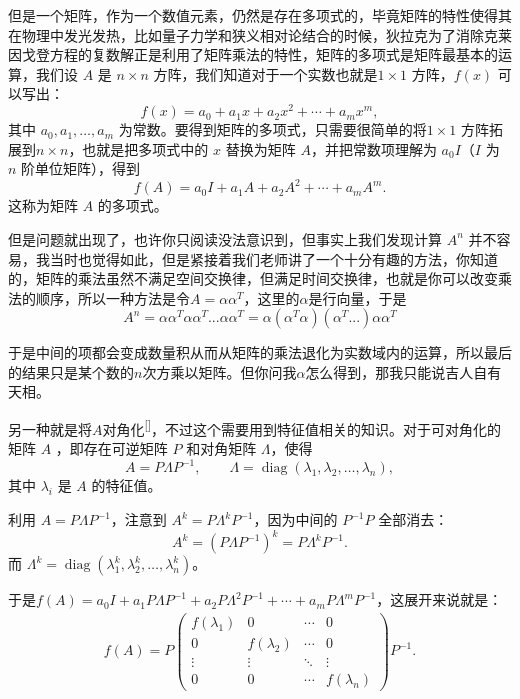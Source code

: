 \documentclass[UTF8]{ctexbook}
\begin{document}
但是一个矩阵，作为一个数值元素，仍然是存在多项式的，毕竟矩阵的特性使得其在物理中发光发热，比如量子力学和狭义相对论结合的时候，狄拉克为了消除克莱因戈登方程的复数解正是利用了矩阵乘法的特性，矩阵的多项式是矩阵最基本的运算，我们设 $A$ 是 $n	\times n$ 方阵，我们知道对于一个实数也就是$1	\times 1$ 方阵，$f(x)$ 可以写出：
\[
f(x)=a_0+a_1x+a_2x^2+\cdots+a_mx^m,
\]
其中 $a_0,a_1,\dots,a_m$ 为常数。要得到矩阵的多项式，只需要很简单的将$1	\times 1$ 方阵拓展到$n	\times n$，也就是把多项式中的 $x$ 替换为矩阵 $A$，并把常数项理解为 $a_0I$（$I$ 为 $n$ 阶单位矩阵），得到
\[
f(A)=a_0I+a_1A+a_2A^2+\cdots+a_mA^m.
\]
这称为矩阵 $A$ 的多项式。

但是问题就出现了，也许你只阅读没法意识到，但事实上我们发现计算 $A^n$ 并不容易，我当时也觉得如此，但是紧接着我们老师讲了一个十分有趣的方法，你知道的，矩阵的乘法虽然不满足空间交换律，但满足时间交换律，也就是你可以改变乘法的顺序，所以一种方法是令$A=\alpha \alpha^T$，这里的$\alpha$是行向量，于是
\[A^n=\alpha \alpha^T \alpha \alpha^T...\alpha \alpha^T=\alpha (\alpha^T \alpha) (\alpha^T...)\alpha \alpha^T\]

于是中间的项都会变成数量积从而从矩阵的乘法退化为实数域内的运算，所以最后的结果只是某个数的$n$次方乘以矩阵。但你问我$\alpha$怎么得到，那我只能说吉人自有天相。

另一种就是将$A$对角化\label{matrix_polynomial}\textsuperscript{[\pageref{diag}]}，不过这个需要用到特征值相关的知识。对于可对角化的矩阵 $A$ ，即存在可逆矩阵 $P$ 和对角矩阵 $\Lambda$，使得
\[
A = P \Lambda P^{-1}, \qquad
\Lambda = \operatorname{diag}(\lambda_1, \lambda_2, \dots, \lambda_n),
\]
其中 $\lambda_i$ 是 $A$ 的特征值。

利用 $A = P\Lambda P^{-1}$，注意到 $A^k = P\Lambda^k P^{-1}$，因为中间的 $P^{-1}P$ 全部消去：
\[
A^k = (P\Lambda P^{-1})^k = P\Lambda^k P^{-1}.
\]
而 $\Lambda^k = \operatorname{diag}(\lambda_1^k, \lambda_2^k, \dots, \lambda_n^k)$。

于是$f(A)= a_0 I + a_1 P\Lambda P^{-1} + a_2 P\Lambda^2 P^{-1} + \cdots + a_m P\Lambda^m P^{-1} $，这展开来说就是：
\[
\begin{aligned}
f(A) = P \begin{pmatrix}
f(\lambda_1) & 0 & \cdots & 0 \\
0 & f(\lambda_2) & \cdots & 0 \\
\vdots & \vdots & \ddots & \vdots \\
0 & 0 & \cdots & f(\lambda_n)
\end{pmatrix} P^{-1}.
\end{aligned}
\]
\end{document}
